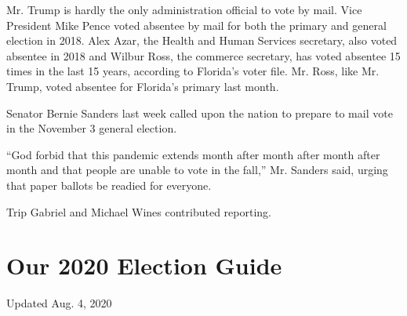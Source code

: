 Mr. Trump is hardly the only administration official to vote by mail.
Vice President Mike Pence voted absentee by mail for both the primary
and general election in 2018. Alex Azar, the Health and Human Services
secretary, also voted absentee in 2018 and Wilbur Ross, the commerce
secretary, has voted absentee 15 times in the last 15 years, according
to Florida's voter file. Mr. Ross, like Mr. Trump, voted absentee for
Florida's primary last month.

Senator Bernie Sanders last week called upon the nation to prepare to
mail vote in the November 3 general election.

``God forbid that this pandemic extends month after month after month
after month and that people are unable to vote in the fall,'' Mr.
Sanders said, urging that paper ballots be readied for everyone.

Trip Gabriel and Michael Wines contributed reporting.

\hypertarget{our-2020-election-guide}{%
\section{Our 2020 Election Guide}\label{our-2020-election-guide}}

Updated Aug. 4, 2020

